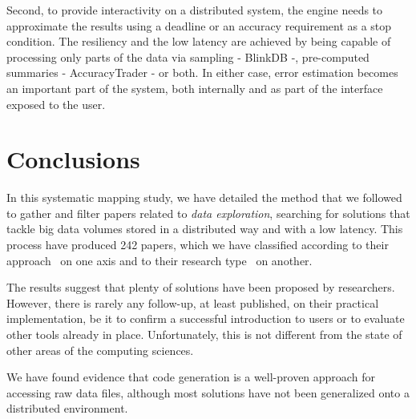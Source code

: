 Second, to provide interactivity on a distributed system, the engine 
needs to approximate the results using a deadline or an accuracy requirement as 
a stop condition. The resiliency and the low latency are achieved by 
being capable of processing only parts of the data via sampling - BlinkDB -, 
pre-computed summaries - AccuracyTrader - or both. In either case, error 
estimation becomes an important part of the system, both internally and as 
part of the interface exposed to the user.

\section{Conclusions}
\label{sec:conclusions}
In this systematic mapping study, we have detailed the method that we followed
to gather and filter papers related to \emph{data exploration}, searching
for solutions that tackle big data volumes stored in a distributed way and with
a low latency. This process have produced 242 papers, which we have classified
according to their approach~\cite{Idreos2015} on one axis and to their research
type~\cite{Wieringa2006} on another.

The results suggest that  plenty of solutions have been proposed by researchers.
However, there is rarely any follow-up, at least published, on their
practical implementation, be it to confirm a successful introduction to users
or to evaluate other tools already in place.
Unfortunately, this is not different from the state of other areas of the computing sciences.

We have found evidence that code generation is a well-proven approach for
accessing raw data files, although most solutions have not been generalized
onto a distributed environment.
